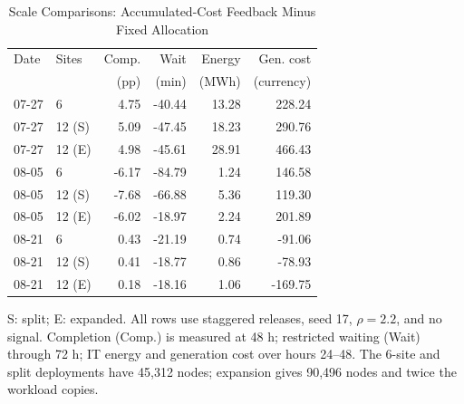 \begin{table}[!htb]
\caption{Scale Comparisons: Accumulated-Cost Feedback Minus Fixed Allocation}
\label{tab:scale-results}
\centering\footnotesize
\setlength{\tabcolsep}{3.2pt}
\begin{tabular*}{\columnwidth}{@{\extracolsep{\fill}}llrrrr@{}}
\toprule
Date & Sites & Comp. & Wait & Energy & Gen. cost\\
 & & (pp) & (min) & (MWh) & (currency)\\
\midrule
07-27 & 6 & 4.75 & -40.44 & 13.28 & 228.24\\
07-27 & 12 (S) & 5.09 & -47.45 & 18.23 & 290.76\\
07-27 & 12 (E) & 4.98 & -45.61 & 28.91 & 466.43\\
08-05 & 6 & -6.17 & -84.79 & 1.24 & 146.58\\
08-05 & 12 (S) & -7.68 & -66.88 & 5.36 & 119.30\\
08-05 & 12 (E) & -6.02 & -18.97 & 2.24 & 201.89\\
08-21 & 6 & 0.43 & -21.19 & 0.74 & -91.06\\
08-21 & 12 (S) & 0.41 & -18.77 & 0.86 & -78.93\\
08-21 & 12 (E) & 0.18 & -18.16 & 1.06 & -169.75\\
\bottomrule
\end{tabular*}
\par\smallskip\begin{minipage}{\columnwidth}\footnotesize
S: split; E: expanded. All rows use staggered releases, seed 17, $\rho=2.2$, and no signal. Completion (Comp.) is measured at 48 h; restricted waiting (Wait) through 72 h; IT energy and generation cost over hours 24--48. The 6-site and split deployments have 45,312 nodes; expansion gives 90,496 nodes and twice the workload copies.
\end{minipage}
\end{table}
